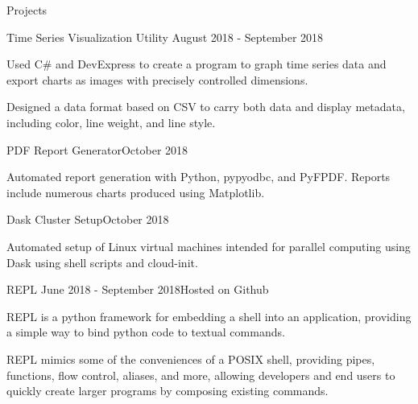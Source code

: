 \documentclass{resume} %
\begin{document}

\begin{rSection}{Projects}

\begin{rSubsection} {Time Series Visualization Utility}
    {August 2018 - September 2018}{}

    \item Used C\# and DevExpress to create a program to graph time series data
        and export charts as images with precisely controlled dimensions.

    \item Designed a data format based on CSV to carry both data and display
        metadata, including color, line weight, and line style.

\end{rSubsection}

\begin{rSubsection}{PDF Report Generator}{October 2018}{}

    \item Automated report generation with Python, pypyodbc, and PyFPDF. Reports
        include numerous charts produced using Matplotlib.

\end{rSubsection}

\begin{rSubsection}{Dask Cluster Setup}{October 2018}{}

\item Automated setup of Linux virtual machines intended for parallel computing
    using Dask using shell scripts and cloud-init.

\end{rSubsection}

\begin{rSubsection}
    {REPL}
    {June 2018 - September 2018}{Hosted on Github}

\item REPL is a python framework for embedding a shell into an application,
    providing a simple way to bind python code to textual commands.

\item REPL mimics some of the conveniences of a POSIX shell, providing pipes,
    functions, flow control, aliases, and more, allowing developers and end
    users to quickly create larger programs by composing existing commands.


\end{rSubsection}
\end{rSection}
\end{document}
